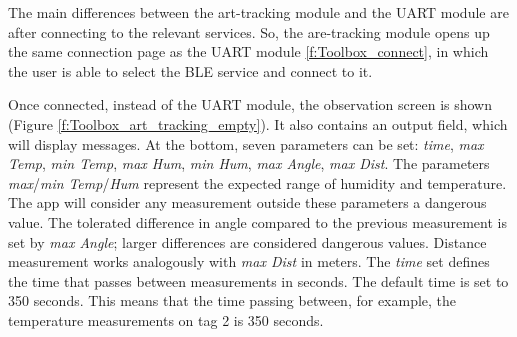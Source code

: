 The main differences between the art-tracking module and the UART module are after connecting to the relevant services.
So, the are-tracking module opens up the same connection page as the UART module \ref{f:Toolbox_connect}, in which the user is able to select the BLE service and connect to it.

Once connected, instead of the UART module, the observation screen is shown (Figure \ref{f:Toolbox_art_tracking_empty}).
It also contains an output field, which will display messages.
At the bottom, seven parameters can be set: \textit{time}, \textit{max Temp}, \textit{min Temp}, \textit{max Hum}, \textit{min Hum}, \textit{max Angle}, \textit{max Dist}.
The parameters \textit{max}/\textit{min} \textit{Temp}/\textit{Hum} represent the expected range of humidity and temperature.
The app will consider any measurement outside these parameters a dangerous value.
The tolerated difference in angle compared to the previous measurement is set by \textit{max Angle}; larger differences are considered dangerous values.
Distance measurement works analogously with \textit{max Dist} in meters.
The \textit{time} set defines the time that passes between measurements in seconds.
The default time is set to 350 seconds.
This means that the time passing between, for example, the temperature measurements on tag 2 is 350 seconds.


